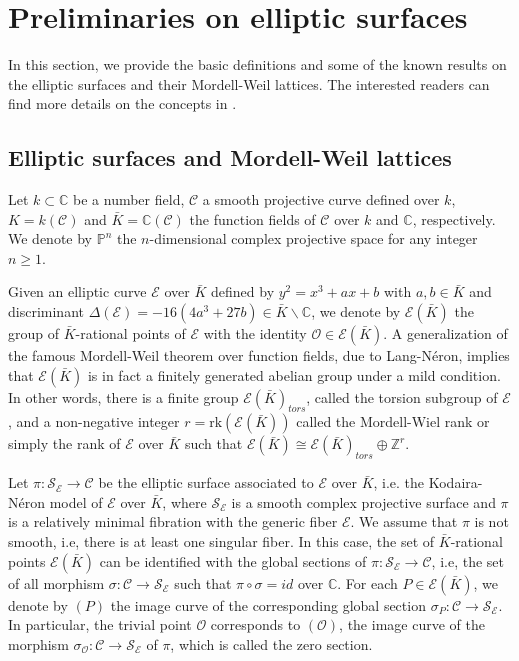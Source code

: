 \documentclass[11pt]{amsart}
\newcommand{\Kb}{{{\bar K}}}
\newcommand{\Z}{{\mathbb Z}}
\newcommand{\Pp}{{\mathbb P}}
\newcommand{\CC}{{\mathbb C}}
\newcommand{\Cc}{{\mathcal C}}
\newcommand{\Ee}{{\mathcal E}}
\newcommand{\OO}{{\mathcal O}}
\newcommand{\Sc}{{\mathcal S}}
\newcommand{\rk}{{\text{rk}}}
\numberwithin{equation}{section}
\numberwithin{table}{section}
\newcommand\<{\langle}
\begin{document}
\section{Preliminaries  on elliptic surfaces}
In this section, we provide the basic definitions and some  of the known results on the elliptic surfaces and their Mordell-Weil lattices. 
The interested readers can find more details on the concepts in
\cite{Shioda1990a, Schuett2019, Silverman1994}.
\subsection{Elliptic surfaces and Mordell-Weil lattices}

Let $k \subset \CC$ be a number  field,  $\Cc$ a smooth projective curve
defined over $k$,  $K=k(\Cc)$  and $\Kb=\CC(\Cc)$ the function fields of $\Cc$ over $k$ and $\CC$, respectively.
We denote by $\Pp^n$ the $n$-dimensional complex projective space for any integer $n\geq 1$.

Given an elliptic curve $\Ee$ over $\Kb$ defined by $ y^2=x^3+ a x + b$ with  $a, b\in \Kb$ and 
discriminant  $\Delta(\Ee) = - 16 (4 a^3+ 27 b) \in \Kb \backslash \CC$,  we denote by $\Ee(\Kb)$ the group of $\Kb$-rational points of $\Ee$
with the identity $\OO \in \Ee(\Kb).$
A generalization of the famous Mordell-Weil theorem over function fields, due to Lang-N\'{e}ron, implies
that $\Ee(\Kb)$  is in fact a finitely generated abelian group under a mild condition. 
In other words, there is a finite group $\Ee(\Kb)_{tors}$, called the torsion subgroup of $\Ee$, and a non-negative integer
$r=\rk (\Ee(\Kb))$ called the {\sf Mordell-Wiel rank} or simply the {\sf rank} of $\Ee$ over $\Kb$ such that $\Ee(\Kb) \cong \Ee(\Kb)_{tors} \oplus \Z^r$.


Let  $\pi: \Sc_\Ee \rightarrow \Cc$  be the {\sf elliptic surface associated to} $\Ee$ over $\Kb$, i.e. the Kodaira-N\'{e}ron model of 
$\Ee$ over $\Kb$, where  $\Sc_\Ee$ is a smooth complex projective surface
and $\pi$ is a relatively minimal fibration with the generic fiber $\Ee$.
We assume that  $\pi$ is not smooth, i.e, there is at least one singular fiber.
In this case, the set of  $\Kb$-rational points  $\Ee(\Kb) $ can be identified with 
the  global sections of  $\pi: \Sc_\Ee \rightarrow \Cc$, i.e, the set of all morphism $\sigma: \Cc \rightarrow \Sc_\Ee$  
such that    $\pi \circ \sigma =id$ over $\CC$.
For each $P\in \Ee(\Kb)$, we denote by $(P)$ the image curve of the corresponding global section
$\sigma_P: \Cc \rightarrow \Sc_\Ee$. In particular, the trivial point $\OO$ corresponds to $(\OO)$,  the
image curve of the morphism  $\sigma_\OO: \Cc \rightarrow \Sc_\Ee$ of  $\pi$, which is called  the   {\sf zero section}.
\end{document}
